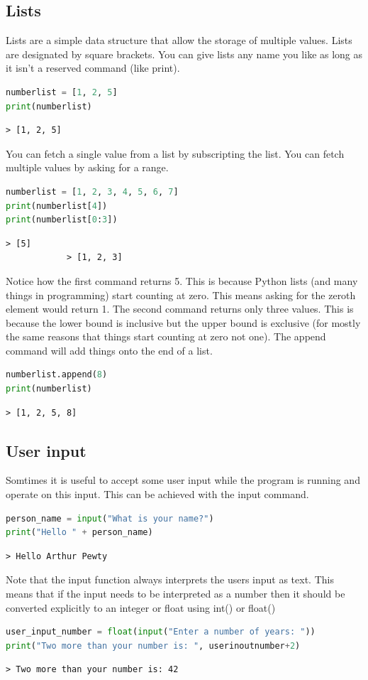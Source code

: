 	\subsection{Lists}
	Lists are a simple data structure that allow the storage of multiple values. Lists are designated by square brackets. You can give lists any name you like as long as it isn't a reserved command (like print).
		\begin{lstlisting}[language=Python]
numberlist = [1, 2, 5]
print(numberlist)\end{lstlisting}
		\begin{verbatim}> [1, 2, 5]\end{verbatim}
		You can fetch a single value from a list by subscripting the list. You can fetch multiple values by asking for a range.
		
		\begin{lstlisting}[language=Python]
numberlist = [1, 2, 3, 4, 5, 6, 7]
print(numberlist[4])
print(numberlist[0:3])\end{lstlisting}
		\begin{verbatim}> [5]
			> [1, 2, 3]
		\end{verbatim}
		Notice how the first command returns 5. This is because Python lists (and many things in programming) start counting at zero. This means asking for the zeroth element would return 1.
		The second command returns only three values. This is because the lower bound is inclusive but the upper bound is exclusive (for mostly the same reasons that things start counting at zero not one). 
		The append command will add things onto the end of a list.
		\begin{lstlisting}[language=Python]
numberlist.append(8)
print(numberlist)	\end{lstlisting}
		\begin{verbatim}> [1, 2, 5, 8]\end{verbatim}
	\subsection{User input}
		Somtimes it is useful to accept some user input while the program is running and operate on this input. This can be achieved with the input command.
		\begin{lstlisting}[language=Python]
person_name = input("What is your name?")
print("Hello " + person_name)\end{lstlisting}
		\begin{verbatim}> Hello Arthur Pewty\end{verbatim}
		Note that the input function always interprets the users input as text. This means that if the input needs to be interpreted as a number then it should be converted explicitly to an integer or float using int() or float()
		\begin{lstlisting}[language=Python]
user_input_number = float(input("Enter a number of years: "))
print("Two more than your number is: ", userinoutnumber+2)\end{lstlisting}
		\begin{verbatim}> Two more than your number is: 42\end{verbatim}


